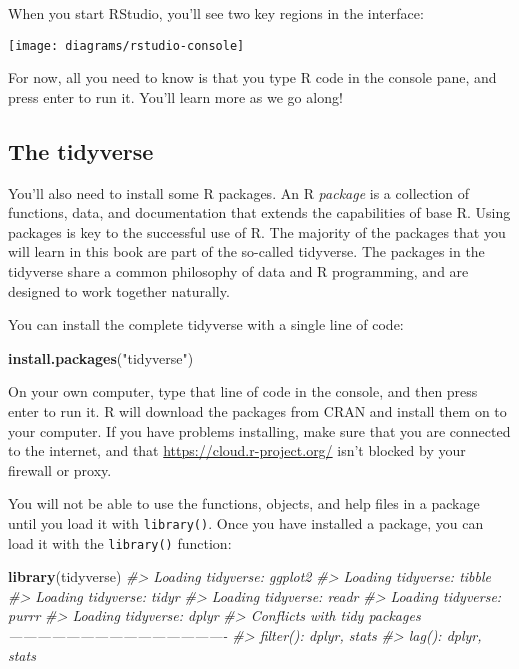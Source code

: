 \documentclass[]{book}
\newenvironment{Shaded}{\begin{snugshade}}{\end{snugshade}}
\newcommand{\KeywordTok}[1]{\textcolor[rgb]{0.13,0.29,0.53}{\textbf{{#1}}}}
\newcommand{\StringTok}[1]{\textcolor[rgb]{0.31,0.60,0.02}{{#1}}}
\newcommand{\CommentTok}[1]{\textcolor[rgb]{0.56,0.35,0.01}{\textit{{#1}}}}
\newcommand{\NormalTok}[1]{{#1}}
\begin{document}
When you start RStudio, you'll see two key regions in the interface:

\begin{center}\texttt{[image: diagrams/rstudio-console]} \end{center}

For now, all you need to know is that you type R code in the console
pane, and press enter to run it. You'll learn more as we go along!

\subsection{The tidyverse}\label{the-tidyverse}

You'll also need to install some R packages. An R \emph{package} is a
collection of functions, data, and documentation that extends the
capabilities of base R. Using packages is key to the successful use of
R. The majority of the packages that you will learn in this book are
part of the so-called tidyverse. The packages in the tidyverse share a
common philosophy of data and R programming, and are designed to work
together naturally.

You can install the complete tidyverse with a single line of code:

\begin{Shaded}
\begin{Highlighting}[]
\KeywordTok{install.packages}\NormalTok{(}\StringTok{"tidyverse"}\NormalTok{)}
\end{Highlighting}
\end{Shaded}

On your own computer, type that line of code in the console, and then
press enter to run it. R will download the packages from CRAN and
install them on to your computer. If you have problems installing, make
sure that you are connected to the internet, and that
\url{https://cloud.r-project.org/} isn't blocked by your firewall or
proxy.

You will not be able to use the functions, objects, and help files in a
package until you load it with \texttt{library()}. Once you have
installed a package, you can load it with the \texttt{library()}
function:

\begin{Shaded}
\begin{Highlighting}[]
\KeywordTok{library}\NormalTok{(tidyverse)}
\CommentTok{#> Loading tidyverse: ggplot2}
\CommentTok{#> Loading tidyverse: tibble}
\CommentTok{#> Loading tidyverse: tidyr}
\CommentTok{#> Loading tidyverse: readr}
\CommentTok{#> Loading tidyverse: purrr}
\CommentTok{#> Loading tidyverse: dplyr}
\CommentTok{#> Conflicts with tidy packages ----------------------------------------------}
\CommentTok{#> filter(): dplyr, stats}
\CommentTok{#> lag():    dplyr, stats}
\end{Highlighting}
\end{Shaded}
\end{document}
